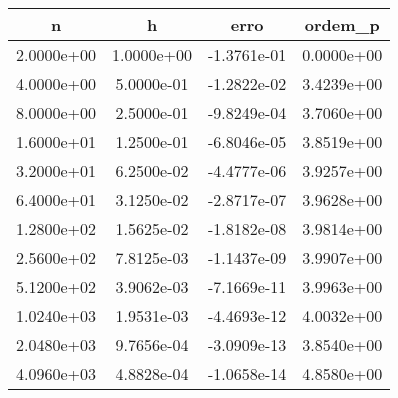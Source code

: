 \begin{table}[htb]
    \centering
    \begin{tabular}{@{}cccc@{}}
        \toprule
        n & h & erro & ordem\_p \\ \hline
        \midrule
        2.0000e+00 & 1.0000e+00 & -1.3761e-01 & 0.0000e+00 \\ \hline
        4.0000e+00 & 5.0000e-01 & -1.2822e-02 & 3.4239e+00 \\ \hline
        8.0000e+00 & 2.5000e-01 & -9.8249e-04 & 3.7060e+00 \\ \hline
        1.6000e+01 & 1.2500e-01 & -6.8046e-05 & 3.8519e+00 \\ \hline
        3.2000e+01 & 6.2500e-02 & -4.4777e-06 & 3.9257e+00 \\ \hline
        6.4000e+01 & 3.1250e-02 & -2.8717e-07 & 3.9628e+00 \\ \hline
        1.2800e+02 & 1.5625e-02 & -1.8182e-08 & 3.9814e+00 \\ \hline
        2.5600e+02 & 7.8125e-03 & -1.1437e-09 & 3.9907e+00 \\ \hline
        5.1200e+02 & 3.9062e-03 & -7.1669e-11 & 3.9963e+00 \\ \hline
        1.0240e+03 & 1.9531e-03 & -4.4693e-12 & 4.0032e+00 \\ \hline
        2.0480e+03 & 9.7656e-04 & -3.0909e-13 & 3.8540e+00 \\ \hline
        4.0960e+03 & 4.8828e-04 & -1.0658e-14 & 4.8580e+00 \\ \hline
        \bottomrule
    \end{tabular}
\end{table}
